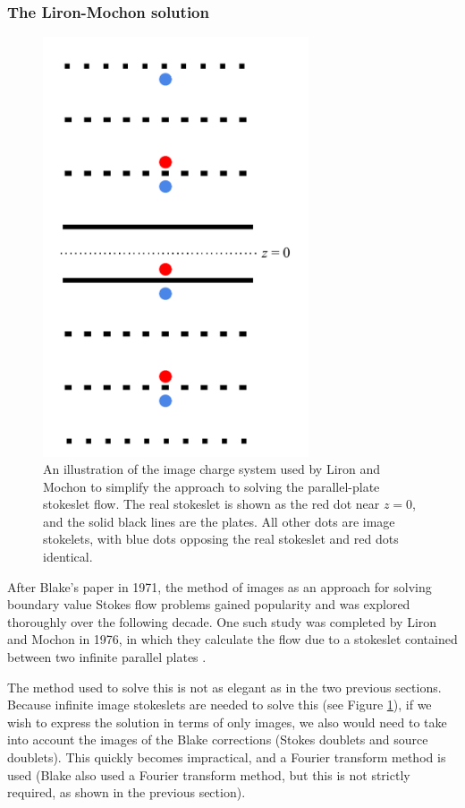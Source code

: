 \documentclass[11pt]{ucthesis}
\begin{document}
\subsubsection{The Liron-Mochon solution}
\label{sec:lironmochontensor}

\begin{figure}
\centering
\includegraphics[width=0.7\textwidth]{liron_img}
\caption{An illustration of the image charge system used by Liron and Mochon to simplify the approach to solving the parallel-plate stokeslet flow. The real stokeslet is shown as the red dot near $z=0$, and the solid black lines are the plates. All other dots are image stokelets, with blue dots opposing the real stokeslet and red dots identical. \label{fig:liron_img}}
\end{figure}

After Blake's paper in 1971, the method of images as an approach for solving boundary value Stokes flow problems gained popularity and was explored thoroughly over the following decade. One such study was completed by Liron and Mochon in 1976, in which they calculate the flow due to a stokeslet contained between two infinite parallel plates \cite{Liron1976}.

The method used to solve this is not as elegant as in the two previous sections. Because infinite image stokeslets are needed to solve this (see Figure \ref{fig:liron_img}), if we wish to express the solution in terms of only images, we also would need to take into account the images of the Blake corrections (Stokes doublets and source doublets). This quickly becomes impractical, and a Fourier transform method is used (Blake also used a Fourier transform method, but this is not strictly required, as shown in the previous section).
\end{document}
